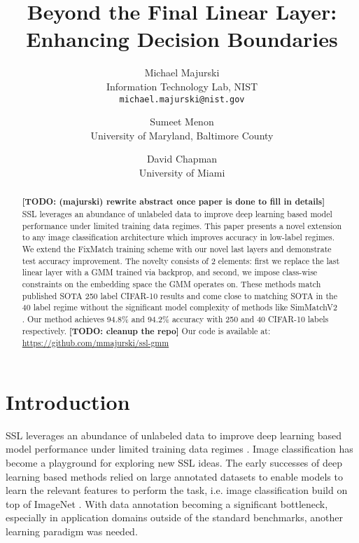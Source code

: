 \documentclass[10pt,twocolumn,letterpaper]{article}
\newcommand{\TODO}[1]{\textbf{\color{red}[TODO: #1]}}
\begin{document}
	
\title{Beyond the Final Linear Layer: Enhancing Decision Boundaries}

\author{Michael Majurski\\
	Information Technology Lab, NIST\\
	{\tt\small michael.majurski@nist.gov}
\and
Sumeet Menon\\
University of Maryland, Baltimore County\\
\and
David Chapman\\
University of Miami\\
}

\maketitle


\begin{abstract}
\TODO {(majurski) rewrite abstract once paper is done to fill in details}
SSL leverages an abundance of unlabeled data to improve deep learning based model performance under limited training data regimes.
This paper presents a novel extension to any image classification architecture which improves accuracy in low-label regimes. 
We extend the FixMatch \cite{sohn2020fixmatch} training scheme with our novel last layers and demonstrate test accuracy improvement. 
The novelty consists of 2 elements: first we replace the last linear layer with a GMM trained via backprop, and second, we impose class-wise constraints on the embedding space the GMM operates on.
These methods match published SOTA 250 label CIFAR-10 \cite{cifar10} results and come close to matching SOTA in the 40 label regime without the significant model complexity of methods like SimMatchV2 \cite{zheng2023simmatchv2}.
Our method achieves 94.8\% and 94.2\% accuracy with 250 and 40 CIFAR-10 labels respectively.
\TODO {cleanup the repo}
Our code is available at: \url{https://github.com/mmajurski/ssl-gmm}
\end{abstract}


\section{Introduction}
SSL leverages an abundance of unlabeled data to improve deep learning based model performance under limited training data regimes \cite{zhu2022introduction,li2019safe,hady2013semi}.
Image classification has become a playground for exploring new SSL ideas.
The early successes of deep learning based methods relied on large annotated datasets to enable models to learn the relevant features to perform the task, i.e. image classification build on top of ImageNet \cite{deng2009imagenet}.
With data annotation becoming a significant bottleneck, especially in application domains outside of the standard benchmarks, another learning paradigm was needed.
\end{document}
